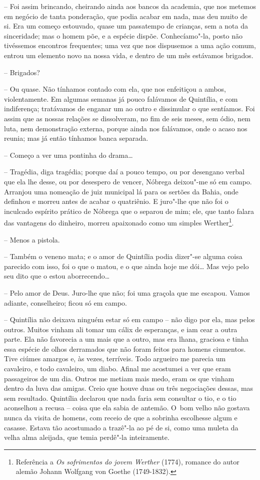 -- Foi assim brincando, cheirando ainda aos bancos da academia, que nos
metemos em negócio de tanta ponderação, que podia acabar em nada, mas
deu muito de si. Era um começo estouvado, quase um passatempo de
crianças, sem a nota da sinceridade; mas o homem põe, e a espécie
dispõe. Conhecíamo"-la, posto não tivéssemos encontros frequentes; uma
vez que nos dispusemos a uma ação comum, entrou um elemento novo na
nossa vida, e dentro de um mês estávamos brigados.

-- Brigados?

-- Ou quase. Não tínhamos contado com ela, que nos enfeitiçou a ambos,
violentamente. Em algumas semanas já pouco falávamos de Quintília, e com
indiferença; tratávamos de enganar um ao outro e dissimular o que
sentíamos. Foi assim que as nossas relações se dissolveram, no fim de
seis meses, sem ódio, nem luta, nem demonstração externa, porque ainda
nos falávamos, onde o acaso nos reunia; mas já então tínhamos banca
separada.

-- Começo a ver uma pontinha do drama\ldots{}

-- Tragédia, diga tragédia; porque daí a pouco tempo, ou por desengano
verbal que ela lhe desse, ou por desespero de vencer, Nóbrega deixou"-me
só em campo. Arranjou uma nomeação de juiz municipal lá para os sertões
da Bahia, onde definhou e morreu antes de acabar o quatriênio. E
juro"-lhe que não foi o inculcado espírito prático de Nóbrega que o
separou de mim; ele, que tanto falara das vantagens do dinheiro, morreu
apaixonado como um simples Werther\footnote{Referência a \emph{Os
  sofrimentos do jovem Werther} (1774), romance do autor alemão Johann
  Wolfgang von Goethe (1749-1832).}.

-- Menos a pistola.

-- Também o veneno mata; e o amor de Quintília podia dizer"-se alguma
coisa parecido com isso, foi o que o matou, e o que ainda hoje me dói\ldots{}
Mas vejo pelo seu dito que o estou aborrecendo\ldots{}

-- Pelo amor de Deus. Juro-lhe que não; foi uma graçola que me escapou.
Vamos adiante, conselheiro; ficou só em campo.

-- Quintília não deixava ninguém estar só em campo -- não digo por ela,
mas pelos outros. Muitos vinham ali tomar um cálix de esperanças, e iam
cear a outra parte. Ela não favorecia a um mais que a outro, mas era
lhana, graciosa e tinha essa espécie de olhos derramados que não foram
feitos para homens ciumentos. Tive ciúmes amargos e, às vezes,
terríveis. Todo argueiro me parecia um cavaleiro, e todo cavaleiro, um
diabo. Afinal me acostumei a ver que eram passageiros de um dia. Outros
me metiam mais medo, eram os que vinham dentro da luva das amigas. Creio
que houve duas ou três negociações dessas, mas sem resultado. Quintília
declarou que nada faria sem consultar o tio, e o tio aconselhou a recusa
-- coisa que ela sabia de antemão. O~bom velho não gostava nunca da
visita de homens, com receio de que a sobrinha escolhesse algum e
casasse. Estava tão acostumado a trazê"-la ao pé de si, como uma muleta
da velha alma aleijada, que temia perdê"-la inteiramente.

